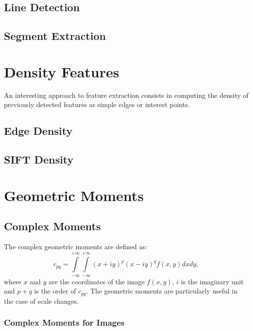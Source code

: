 \subsection{Line Detection}
\label{sec:LineDetection}






\subsection{Segment Extraction}
\label{sec:SegmentExtraction}

%
%


\section{Density Features}
An interesting approach to feature extraction consists in computing
the density of previously detected features as simple edges or
interest points.
\subsection{Edge Density}

\subsection{SIFT Density}


\section{Geometric Moments}

\subsection{Complex Moments}
\label{sec:ComplexMoments}
The complex geometric moments are defined as:
\begin {equation}
c_{pq} = \int\limits_{-\infty}^{+\infty}\int\limits_{-\infty}^{+\infty}(x + iy)^p(x- iy)^qf(x,y)dxdy,
\label{2.2}
\end{equation}
where $x$ and $y$ are the coordinates of the image $f(x,y)$, $i$ is the
imaginary unit and
$p+q$ is the order of $c_{pq}$. The geometric moments are
particularly useful in the case of scale changes.

\subsubsection{Complex Moments for Images}

